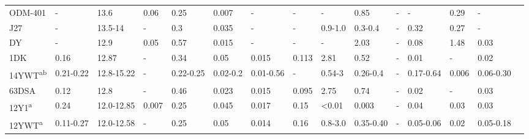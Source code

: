\begin{sidewaystable}[]
{\begin{tabular}{lllllllllllllll}
ODM-401               & -           & 13.6        & 0.06            & 0.25          & 0.007           & -          & -          & -               & 0.85            & -               & -               & 0.29        & -           &\cite{RN2616}              \\
J27                   & -           & 13.5-14     & -               & 0.3           & 0.035           & -          & -          & 0.9-1.0         & 0.3-0.4         & -               & 0.32            & 0.27        & -           &\cite{RN982,RN2616}              \\
DY                    & -           & 12.9        & 0.05            & 0.57          & 0.015           & -          & -          & -               & 2.03            & -               & 0.08            & 1.48        & 0.03        &\cite{RN1109,RN1089}              \\
1DK                   & 0.16        & 12.87       & -               & 0.34          & 0.05            & 0.015      & 0.113      & 2.81            & 0.52            & -               & 0.01            & -           & 0.02        &\cite{RN1187}              \\
14YWT\textsuperscript{ab}               & 0.21-0.22   & 12.8-15.22  & -               & 0.22-0.25     & 0.02-0.2        & 0.01-0.56  & -          & 0.54-3          & 0.26-0.4        & -               & 0.17-0.64       & 0.006       & 0.06-0.30   &\cite{RN119,RN1187,RN650,RN337,RN738,RN1008,RN663,RN2692,RN948,RN1040,RN265,RN121,RN1087,RN1011,RN1269}              \\
63DSA                 & 0.12        & 12.8        & -               & 0.46          & 0.023           & 0.015      & 0.095      & 2.75            & 0.74            & -               & 0.02            & -           & 0.03        &\cite{RN1187,RN992}              \\
12Y1\textsuperscript{a}                 & 0.24        & 12.0-12.85  & 0.007           & 0.25          & 0.045           & 0.017      & 0.15       & \textless{}0.01 & 0.003           & -               & 0.04            & 0.03        & 0.03        &\cite{RN105,RN953,RN28,RN1060}             \\
12YWT\textsuperscript{a}                & 0.11-0.27   & 12.0-12.58  & -               & 0.25          & 0.05            & 0.014      & 0.16       & 0.8-3.0         & 0.35-0.40       & -               & 0.05-0.06       & 0.02        & 0.05-0.18   &\cite{RN992,RN28,RN1060,RN1006,RN27,RN122,RN294,RN1126,RN2661,RN917}              \\

\end{tabular}}
\end{sidewaystable}
